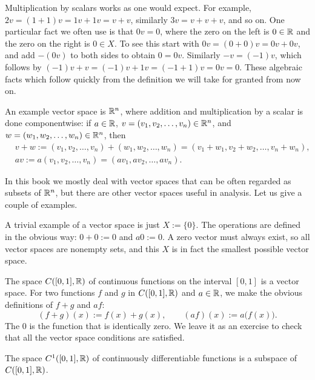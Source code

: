 Multiplication by scalars works as one would expect.
For example, $2v = (1+1)v = 1v + 1v = v+v$, similarly $3v = v+v+v$, and
so on.  
One particular fact we often use is that $0 v = 0$, where
the zero on the left is $0 \in {\mathbb{R}}$ and the zero on the right is $0 \in X$.
To see this start with
$0v = (0+0)v = 0v + 0v$, and add $-(0v)$ to both sides
to obtain $0 = 0v$.  Similarly $-v = (-1)v$, which follows by
$(-1)v+v = (-1)v + 1v = (-1+1)v = 0v = 0$.
These algebraic facts which follow quickly from the definition we will take
for granted from now on.

\begin{example}
An example vector space is ${\mathbb{R}}^n$, where addition
and multiplication by a scalar is done componentwise:
if $a \in {\mathbb{R}}$, $v = (v_1,v_2,\ldots,v_n) \in {\mathbb{R}}^n$, and $w =
(w_1,w_2,\ldots,w_n) \in {\mathbb{R}}^n$, then
\begin{align*}
& v+w :=
(v_1,v_2,\ldots,v_n) +
(w_1,w_2,\ldots,w_n) 
=
(v_1+w_1,v_2+w_2,\ldots,v_n+w_n) , \\
& a v :=
a (v_1,v_2,\ldots,v_n) =
(a v_1, a v_2,\ldots, a v_n) .
\end{align*}
\end{example}

In this book we mostly deal with vector spaces that can be often regarded as
subsets of ${\mathbb{R}}^n$, but there are other vector spaces useful in
analysis.  Let us give a couple of examples.

\begin{example}
A trivial example of a vector space is just
$X := \{ 0 \}$.  The operations are defined in the obvious way: $0 + 0 := 0$
and $a0 := 0$.  A zero vector must always exist,
so all vector spaces are nonempty sets, and this $X$ is in fact the smallest
possible vector space.
\end{example}

\begin{example}
The space $C([0,1],{\mathbb{R}})$ of continuous functions on the interval $[0,1]$
is a vector space.  For two functions $f$ and $g$ in $C([0,1],{\mathbb{R}})$ and
$a \in {\mathbb{R}}$, we make the obvious definitions of $f+g$ and $af$:
\begin{equation*}
(f+g)(x) := f(x) + g(x), \qquad (af) (x) := a\bigl(f(x)\bigr) .
\end{equation*}
The 0 is the function that is identically zero.  We leave it as an exercise
to check that all the vector space conditions are satisfied.

The space $C^1([0,1],{\mathbb{R}})$ of continuously differentiable functions is
a subspace of $C([0,1],{\mathbb{R}})$.
\end{example}

